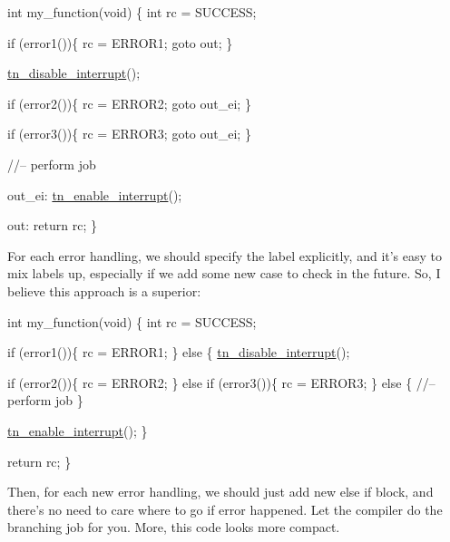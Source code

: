 \begin{DoxyCode}
\textcolor{keywordtype}{int} my\_function(\textcolor{keywordtype}{void})
\{
   \textcolor{keywordtype}{int} rc = SUCCESS;

   \textcolor{keywordflow}{if} (error1())\{
      rc = ERROR1;
      \textcolor{keywordflow}{goto} out;
   \}

   \hyperlink{tn__oldsymbols_8h_a27bf94f93625fa36125c3fa3ae6b4041}{tn\_disable\_interrupt}();

   \textcolor{keywordflow}{if} (error2())\{
      rc = ERROR2;
      \textcolor{keywordflow}{goto} out\_ei;
   \}

   \textcolor{keywordflow}{if} (error3())\{
      rc = ERROR3;
      \textcolor{keywordflow}{goto} out\_ei;
   \}

   \textcolor{comment}{//-- perform job}

out\_ei:
   \hyperlink{tn__oldsymbols_8h_acc85567ca09ede9cf2d58717506def46}{tn\_enable\_interrupt}();

out:
   \textcolor{keywordflow}{return} rc;
\}
\end{DoxyCode}


For each error handling, we should specify the label explicitly, and it's easy to mix labels up, especially if we add some new case to check in the future. So, I believe this approach is a superior\+:


\begin{DoxyCode}
\textcolor{keywordtype}{int} my\_function(\textcolor{keywordtype}{void})
\{
   \textcolor{keywordtype}{int} rc = SUCCESS;

   \textcolor{keywordflow}{if} (error1())\{
      rc = ERROR1;
   \} \textcolor{keywordflow}{else} \{
      \hyperlink{tn__oldsymbols_8h_a27bf94f93625fa36125c3fa3ae6b4041}{tn\_disable\_interrupt}();

      \textcolor{keywordflow}{if} (error2())\{
         rc = ERROR2;
      \} \textcolor{keywordflow}{else} \textcolor{keywordflow}{if} (error3())\{
         rc = ERROR3;
      \} \textcolor{keywordflow}{else} \{
         \textcolor{comment}{//-- perform job}
      \}

      \hyperlink{tn__oldsymbols_8h_acc85567ca09ede9cf2d58717506def46}{tn\_enable\_interrupt}();
   \}

   \textcolor{keywordflow}{return} rc;
\}
\end{DoxyCode}


Then, for each new error handling, we should just add new {\ttfamily else if} block, and there's no need to care where to go if error happened. Let the compiler do the branching job for you. More, this code looks more compact.

